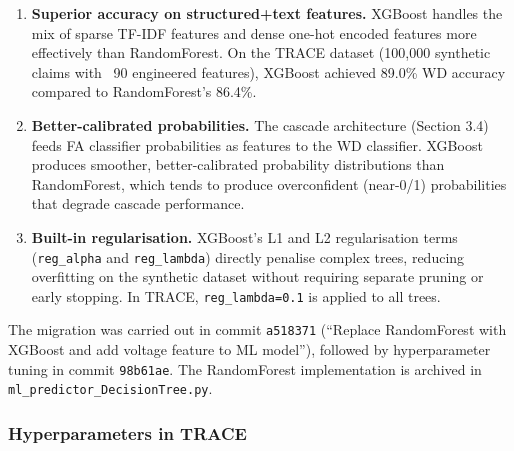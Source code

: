 \documentclass[10pt]{article}
\begin{document}
\begin{enumerate}
    \item \textbf{Superior accuracy on structured+text features.} XGBoost handles the mix of sparse TF-IDF features and dense one-hot encoded features more effectively than RandomForest. On the TRACE dataset (100{,}000 synthetic claims with ~90 engineered features), XGBoost achieved 89.0\% WD accuracy compared to RandomForest's 86.4\%.

    \item \textbf{Better-calibrated probabilities.} The cascade architecture (Section 3.4) feeds FA classifier probabilities as features to the WD classifier. XGBoost produces smoother, better-calibrated probability distributions than RandomForest, which tends to produce overconfident (near-0/1) probabilities that degrade cascade performance.

    \item \textbf{Built-in regularisation.} XGBoost's L1 and L2 regularisation terms (\texttt{reg\_alpha} and \texttt{reg\_lambda}) directly penalise complex trees, reducing overfitting on the synthetic dataset without requiring separate pruning or early stopping. In TRACE, \texttt{reg\_lambda=0.1} is applied to all trees.
\end{enumerate}

The migration was carried out in commit \texttt{a518371} (``Replace RandomForest with XGBoost and add voltage feature to ML model''), followed by hyperparameter tuning in commit \texttt{98b61ae}. The RandomForest implementation is archived in \texttt{ml\_predictor\_DecisionTree.py}.

\subsubsection{Hyperparameters in TRACE}
\end{document}
